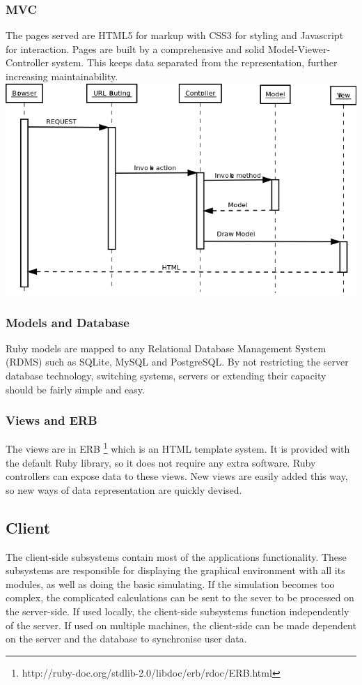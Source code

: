 \documentclass{report}
\begin{document}
				\subsubsection{MVC}
					The pages served are HTML5 for markup with CSS3 for styling and Javascript for interaction. Pages are built by a comprehensive and solid Model-Viewer-Controller system. This keeps data separated from the representation, further increasing maintainability.\\
					\includegraphics[scale=0.5]{SequenceDiagramLife.png} 				 
				\subsubsection{Models and Database}
					Ruby models are mapped to any Relational Database Management System (RDMS) such as SQLite, MySQL and PostgreSQL. By not restricting the server database technology, switching systems, servers or extending  their capacity should be fairly simple and easy.
				\subsubsection{Views and ERB} 
					The views are in ERB \footnote{http://ruby-doc.org/stdlib-2.0/libdoc/erb/rdoc/ERB.html} which is an HTML template system. It is provided with the default Ruby library, so it does not require any extra software. Ruby controllers can expose data to these views. New views are easily added this way, so new ways of data representation are quickly devised.
			\newpage

			\subsection{Client}
				The client-side subsystems contain most of the applications functionality. These subsystems are responsible for displaying the graphical environment with all its modules, as well as doing the basic simulating. If the simulation becomes too complex, the complicated calculations can be sent to the sever to be processed on the server-side. If used locally, the client-side subsystems function independently of the server. If used on multiple machines, the client-side can be made dependent on the server and the database to synchronise user data.
\end{document}
